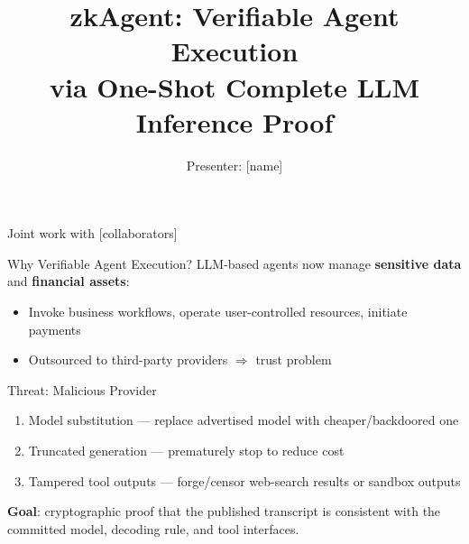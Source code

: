 \documentclass[aspectratio=169,10pt]{beamer}
\title{zkAgent: Verifiable Agent Execution\\via One-Shot Complete LLM Inference Proof}
\author{Presenter: [name]}
\institute{Shanghai Jiao Tong University}
\date{}
\newcommand{\pos}[1]{\textcolor{positive}{#1}}
\renewcommand{\neg}[1]{\textcolor{negative}{#1}}
\begin{document}
\begin{frame}
\titlepage
\vspace{-8pt}
{\small Joint work with [collaborators]}
\end{frame}


\begin{frame}{Why Verifiable Agent Execution?}
LLM-based agents now manage \textbf{sensitive data} and \textbf{financial assets}:
\begin{itemize}
  \item Invoke business workflows, operate user-controlled resources, initiate payments
  \item Outsourced to third-party providers $\Rightarrow$ \neg{trust problem}
\end{itemize}

\vspace{6pt}
\begin{alertblock}{Threat: Malicious Provider}
\begin{enumerate}
  \item \neg{Model substitution} --- replace advertised model with cheaper/backdoored one
  \item \neg{Truncated generation} --- prematurely stop to reduce cost
  \item \neg{Tampered tool outputs} --- forge/censor web-search results or sandbox outputs
\end{enumerate}
\end{alertblock}

\vspace{4pt}
\textbf{Goal}: cryptographic proof that the published transcript is consistent with the \pos{committed model}, \pos{decoding rule}, and \pos{tool interfaces}.
\end{frame}
\end{document}
